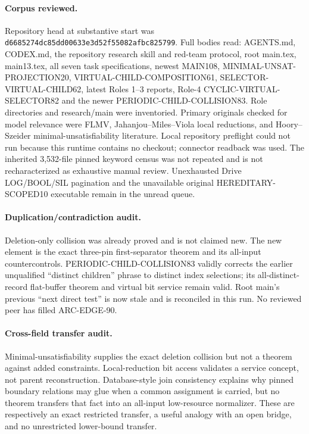 \documentclass[11pt]{article}
\begin{document}
\paragraph{Corpus reviewed.}
Repository head at substantive start was
\texttt{d6685274dc85dd00633e3d52f55082afbc825799}.  Full bodies read:
AGENTS.md, CODEX.md, the repository research skill and red-team protocol,
root main.tex, main13.tex, all seven task specifications, newest MAIN108,
MINIMAL-UNSAT-PROJECTION20, VIRTUAL-CHILD-COMPOSITION61,
SELECTOR-VIRTUAL-CHILD62, latest Roles 1--3 reports, Role-4
CYCLIC-VIRTUAL-SELECTOR82 and the newer PERIODIC-CHILD-COLLISION83.
Role directories and research/main were inventoried.  Primary originals
checked for model relevance were FLMV, Jahanjou--Miles--Viola local
reductions, and Hoory--Szeider minimal-unsatisfiability literature.  Local
repository preflight could not run because this runtime contains no checkout;
connector readback was used.  The inherited 3,532-file pinned keyword census
was not repeated and is not recharacterized as exhaustive manual review.
Unexhausted Drive LOG/BOOL/SIL pagination and the unavailable original
HEREDITARY-SCOPED10 executable remain in the unread queue.

\paragraph{Duplication/contradiction audit.}
Deletion-only collision was already proved and is not claimed new.  The new
element is the exact three-pin first-separator theorem and its all-input
countercontrols.  PERIODIC-CHILD-COLLISION83 validly corrects the earlier
unqualified ``distinct children'' phrase to distinct index selections; its
all-distinct-record flat-buffer theorem and virtual bit service remain valid.
Root main's previous ``next direct test'' is now stale and is reconciled in
this run.  No reviewed peer has filled ARC-EDGE-90.

\paragraph{Cross-field transfer audit.}
Minimal-unsatisfiability supplies the exact deletion collision but not a
theorem against added constraints.  Local-reduction bit access validates a
service concept, not parent reconstruction.  Database-style join consistency
explains why pinned boundary relations may glue when a common assignment is
carried, but no theorem transfers that fact into an all-input low-resource
normalizer.  These are respectively an exact restricted transfer, a useful
analogy with an open bridge, and no unrestricted lower-bound transfer.
\end{document}
